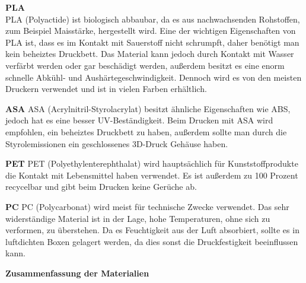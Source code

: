 \textbf{PLA}\\
PLA (Polyactide) ist biologisch abbaubar, da es aus nachwachsenden Rohstoffen, zum Beispiel Maisstärke, hergestellt wird.
Eine der wichtigen Eigenschaften von PLA ist, dass es im Kontakt mit Sauerstoff nicht schrumpft, daher benötigt man kein beheiztes Druckbett.
Das Material kann jedoch durch Kontakt mit Wasser verfärbt werden oder gar beschädigt werden, außerdem besitzt
es eine enorm schnelle Abkühl- und Aushärtegeschwindigkeit.
Dennoch wird es von den meisten Druckern verwendet und ist in vielen Farben erhältlich.

\textbf{ASA}
ASA (Acrylnitril-Styrolacrylat) besitzt ähnliche Eigenschaften wie ABS, jedoch hat es eine besser UV-Beständigkeit.
Beim Drucken mit ASA wird empfohlen, ein beheiztes Druckbett zu haben, außerdem sollte man durch die Styrolemissionen
ein geschlossenes 3D-Druck Gehäuse haben.

\textbf{PET}
PET (Polyethylenterephthalat) wird hauptsächlich für Kunststoffprodukte die Kontakt mit Lebensmittel haben verwendet.
Es ist außerdem zu 100 Prozent recycelbar und gibt beim Drucken keine Gerüche ab.

\textbf{PC}
PC (Polycarbonat) wird meist für technische Zwecke verwendet.
Das sehr widerständige Material ist in der Lage, hohe Temperaturen, ohne sich zu verformen, zu überstehen.
Da es Feuchtigkeit aus der Luft absorbiert, sollte es in luftdichten Boxen gelagert werden, da dies sonst die Druckfestigkeit beeinflussen kann.

\textbf{Zusammenfassung der Materialien}

\begin{table}[H]
    \centering
    \caption{Vergleich der 3D-Druck Materialien}
\end{table}

